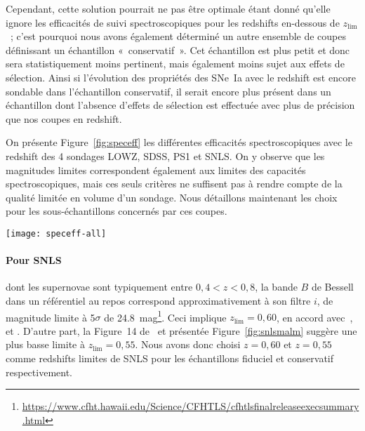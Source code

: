 \documentclass[../main/main.tex]{subfiles}
\begin{document}
Cependant, cette solution pourrait ne pas être optimale étant donné qu'elle
ignore les efficacités de suivi spectroscopiques pour les redshifts en-dessous
de $z_{\lim}$~; c'est pourquoi nous avons également déterminé un autre ensemble
de coupes définissant un échantillon «~conservatif~». Cet échantillon est plus
petit et donc sera statistiquement moins pertinent, mais également moins sujet
aux effets de sélection. Ainsi si l'évolution des propriétés des SNe~Ia avec le
redshift est encore sondable dans l'échantillon conservatif, il serait encore
plus présent dans un échantillon dont l'absence d'effets de sélection est
effectuée avec plus de précision que nos coupes en redshift.

On présente Figure~\ref{fig:speceff} les différentes efficacités
spectroscopiques avec le redshift des 4 sondages LOWZ, SDSS, PS1 et SNLS. On y
observe que les magnitudes limites correspondent également aux limites des
capacités spectroscopiques, mais ces seuls critères ne suffisent pas à rendre
compte de la qualité limitée en volume d'un sondage. Nous détaillons maintenant
les choix pour les sous-échantillons concernés par ces coupes.

\begin{SCfigure}[0.5][h!]
    \centering
    \texttt{[image: speceff-all]}
    \caption{Comparaison des efficacités spectroscopiques des différents
    sondages.}
    \label{fig:speceff}
\end{SCfigure}

\paragraph*{Pour SNLS} dont les supernovae sont typiquement entre $0,4 < z <
0,8$, la bande $B$ de Bessell dans un référentiel au repos correspond
approximativement à son filtre $i$, de magnitude limite à 5$\sigma$ de
\SI{24,8}{mag}\footnote{\href{
    https://www.cfht.hawaii.edu/Science/CFHTLS/cfhtlsfinalreleaseexecsummary.html}
{https://www.cfht.hawaii.edu/Science/CFHTLS/cfhtlsfinalreleaseexecsummary.html}}.
Ceci implique $z_{\lim} = 0,60$, en accord avec~\cite{neill2006, perrett2010},
et \citep[Section~2.2]{conley2011}. D'autre part, la Figure~14
de~\cite{perrett2010} et présentée Figure~\ref{fig:snlsmalm} suggère une plus
basse limite à $z_{\lim} = 0,55$. Nous avons donc choisi $z=0,60$ et $z=0,55$
comme redshifts limites de SNLS pour les échantillons fiduciel et conservatif
respectivement.
\end{document}
